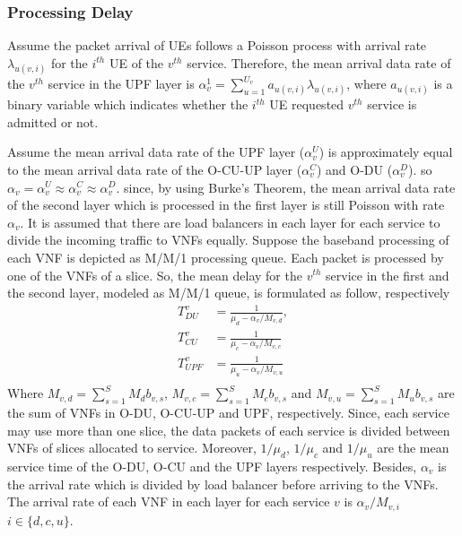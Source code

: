 \documentclass[conference]{IEEEtran}
\begin{document}
\subsubsection{Processing Delay}
Assume the packet arrival of UEs follows a Poisson process with arrival rate $\lambda_{u(v,i)}$ for the $i^{th}$ UE of the $v^{th}$ service.
Therefore, the mean arrival data rate of the $v^{th}$ service in the UPF layer is $\alpha_{v}^1 = \sum_{u=1}^{U_v}a_{u(v,i)}\lambda_{u(v,i)}$, where $a_{u(v,i)}$ is a binary variable which indicates whether the $i^{th}$ UE requested $v^{th}$ service is admitted or not.

Assume the mean arrival data rate of the UPF layer ($\alpha_{v}^U$) is approximately equal to the mean arrival data rate of the O-CU-UP layer ($\alpha_{v}^C$) and O-DU ($\alpha_{v}^D$). so $\alpha_{v} =\alpha_{v}^U \approx \alpha_{v}^C \approx \alpha_{v}^D$. since, by using Burke’s Theorem, the mean arrival data rate of the second layer which is processed in the first layer is still Poisson with rate $\alpha_{v}$.
It is assumed that there are load balancers in each layer for each service to divide the incoming traffic to VNFs equally. %
Suppose the baseband processing of each VNF is depicted as M/M/1 processing queue.
Each packet is processed by one of the VNFs of a slice. So, the mean delay for the $v^{th}$ service in the first and the second layer, modeled as M/M/1 queue, is formulated as follow, respectively
\begin{equation}
\begin{split}
T_{DU}^{v} &= \frac{1}{\mu_d - \alpha_{v}/{M_{v,d}}},\\
T_{CU}^{v} &= \frac{1}{\mu_c - \alpha_{v}/{M_{v,c}}}\\
T_{UPF}^{v} &= \frac{1}{\mu_u - \alpha_{v}/{M_{v,u}}}\\
\end{split}
\end{equation}
Where $M_{v,d} = \sum_{s=1}^{S}M_{d} b_{v,s}$, $M_{v,c} = \sum_{s=1}^{S}M_{c} b_{v,s}$ and 
$M_{v,u} = \sum_{s=1}^{S}M_{u} b_{v,s}$ 
are the sum of VNFs in O-DU, O-CU-UP and UPF, respectively. Since, each service may use more than one slice, the data packets of each service is divided between VNFs of slices allocated to service.
Moreover, $1/\mu_d$, $1/\mu_c$ and $1/\mu_u$ are the mean service time of the O-DU, O-CU and the UPF layers respectively.
Besides, $\alpha_{v}$ is the  arrival rate which is divided
by load balancer before arriving to the VNFs. The arrival rate of each VNF in each layer for each service 
$v$ is $\alpha_{v}/{M_{v,i}}$ $ i \in \{d,c, u\}$.
\end{document}
